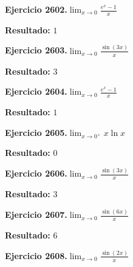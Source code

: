 \documentclass[10pt,a4paper]{article}
\begin{document}
\begin{ejbox}
\textbf{Ejercicio 2602.}\quad $\lim_{x\to 0} \frac{e^x-1}{x}$
\end{ejbox}

\begin{solbox}
\textbf{Resultado:} \(\displaystyle 1\)
\end{solbox}

\begin{ejbox}
\textbf{Ejercicio 2603.}\quad $\lim_{x\to 0} \frac{\sin(3x)}{x}$
\end{ejbox}

\begin{solbox}
\textbf{Resultado:} \(\displaystyle 3\)
\end{solbox}

\newpage
\begin{ejbox}
\textbf{Ejercicio 2604.}\quad $\lim_{x\to 0} \frac{e^x-1}{x}$
\end{ejbox}

\begin{solbox}
\textbf{Resultado:} \(\displaystyle 1\)
\end{solbox}

\begin{ejbox}
\textbf{Ejercicio 2605.}\quad $\lim_{x\to 0^+} x\ln x$
\end{ejbox}

\begin{solbox}
\textbf{Resultado:} \(\displaystyle 0\)
\end{solbox}

\begin{ejbox}
\textbf{Ejercicio 2606.}\quad $\lim_{x\to 0} \frac{\sin(3x)}{x}$
\end{ejbox}

\begin{solbox}
\textbf{Resultado:} \(\displaystyle 3\)
\end{solbox}

\newpage
\begin{ejbox}
\textbf{Ejercicio 2607.}\quad $\lim_{x\to 0} \frac{\sin(6x)}{x}$
\end{ejbox}

\begin{solbox}
\textbf{Resultado:} \(\displaystyle 6\)
\end{solbox}

\begin{ejbox}
\textbf{Ejercicio 2608.}\quad $\lim_{x\to 0} \frac{\sin(2x)}{x}$
\end{ejbox}
\end{document}
